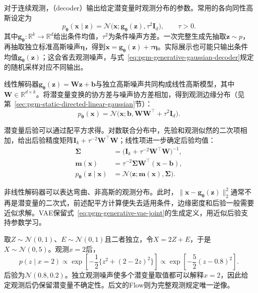 对于连续观测，（decoder）输出给定潜变量时观测分布的参数。常用的各向同性高斯设定为
\begin{equation}
  \label{eq:pgm-generative-gaussian-decoder}
  p_{\bm{\theta}}(\bm{x}\mid\bm{z})
  =\mathcal{N}\bigl(\bm{x};
    \bm{g}_{\bm{\theta}}(\bm{z}),\tau^2\bm{I}_d\bigr),
  \qquad \tau>0.
\end{equation}
其中$\bm{g}_{\bm{\theta}}:\mathbb{R}^{k}\to\mathbb{R}^{d}$给出条件均值，$\tau^2$为条件噪声方差。一次完整生成先抽取$\bm{z}\sim p$，再抽取独立标准高斯噪声$\bm{\eta}$，得到$\bm{x}=\bm{g}_{\bm{\theta}}(\bm{z})+\tau\bm{\eta}$。实际展示也可能只输出条件均值$\bm{g}_{\bm{\theta}}(\bm{z})$；这会省去观测噪声，与式~\eqref{eq:pgm-generative-gaussian-decoder}规定的随机采样对应不同输出。

线性解码器$\bm{g}_{\bm{\theta}}(\bm{z})=\bm{W}\bm{z}+\bm{b}$与独立高斯噪声共同构成线性高斯模型，其中$\bm{W}\in\mathbb{R}^{d\times k}$。将潜变量变换的协方差与噪声协方差相加，得到观测边缘分布（见第~\ref{sec:pgm-static-directed-linear-gaussian}节）：
\[
  p_{\bm{\theta}}(\bm{x})
  =\mathcal{N}\bigl(\bm{x};
    \bm{b},\bm{W}\bm{W}^{\top}+\tau^2\bm{I}_d\bigr).
\]

潜变量后验可以通过配平方求得。对数联合分布中，先验和观测似然的二次项相加，给出后验精度矩阵$\bm{I}_k+\tau^{-2}\bm{W}^{\top}\bm{W}$；线性项进一步确定后验均值：
\begin{equation}
  \label{eq:pgm-generative-linear-posterior}
  \begin{aligned}
    \bm{\Sigma}
      &=\bigl(\bm{I}_k+\tau^{-2}\bm{W}^{\top}\bm{W}\bigr)^{-1},\\
    \bm{m}(\bm{x})
      &=\tau^{-2}\bm{\Sigma}\bm{W}^{\top}(\bm{x}-\bm{b}),\\
    p_{\bm{\theta}}(\bm{z}\mid\bm{x})
      &=\mathcal{N}\bigl(\bm{z};\bm{m}(\bm{x}),\bm{\Sigma}\bigr).
  \end{aligned}
\end{equation}

非线性解码器可以表达弯曲、非高斯的观测分布。此时，$\lVert\bm{x}-\bm{g}_{\bm{\theta}}(\bm{z})\rVert_2^2$通常不再是潜变量的二次式，前述配平方计算便失去适用条件，边缘密度和后验一般需要近似求解。VAE保留式~\eqref{eq:pgm-generative-vae-joint}的生成定义，用近似后验支持参数学习。

\begin{example}[同一观测分布的潜变量解释]
  \label{ex:pgm-generative-gaussian-latent}
  取$Z\sim\mathcal{N}(0,1)$、$E\sim\mathcal{N}(0,1)$且二者独立，令$X=2Z+E$，于是$X\sim\mathcal{N}(0,5)$。观测$x=2$后，
  \[
    p(z\mid x=2)\propto
    \exp\left[-\frac{1}{2}\{z^2+(2-2z)^2\}\right]
    \propto\exp\left[-\frac{5}{2}(z-0.8)^2\right].
  \]
  后验为$\mathcal{N}(0.8,0.2)$。独立观测噪声使多个潜变量取值都可以解释$x=2$，因此给定观测后仍保留潜变量不确定性。后文的Flow则为完整观测规定唯一逆像。
\end{example}

